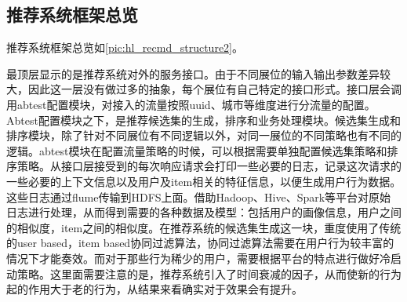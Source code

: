 		\subsection{推荐系统框架总览}
		推荐系统框架总览如\autoref{pic:hl_recmd_structure2}。
		\begin{figure}
	    \centering
	      \label{pic:hl_recmd_structure2}
	    \end{figure}

		最顶层显示的是推荐系统对外的服务接口。由于不同展位的输入输出参数差异较大，因此这一层没有做过多的抽象，每个展位有自己特定的接口形式。接口层会调用abtest配置模块，对接入的流量按照uuid、城市等维度进行分流量的配置。Abtest配置模块之下，是推荐候选集的生成，排序和业务处理模块。候选集生成和排序模块，除了针对不同展位有不同逻辑以外，对同一展位的不同策略也有不同的逻辑。abtest模块在配置流量策略的时候，可以根据需要单独配置候选集策略和排序策略。从接口层接受到的每次响应请求会打印一些必要的日志，记录这次请求的一些必要的上下文信息以及用户及item相关的特征信息，以便生成用户行为数据。这些日志通过flume传输到HDFS上面。借助Hadoop、Hive、Spark等平台对原始日志进行处理，从而得到需要的各种数据及模型：包括用户的画像信息，用户之间的相似度，item之间的相似度。在推荐系统的候选集生成这一块，重度使用了传统的user based，item based协同过滤算法，协同过滤算法需要在用户行为较丰富的情况下才能奏效。而对于那些行为稀少的用户，需要根据平台的特点进行做好冷启动策略。这里面需要注意的是，推荐系统引入了时间衰减的因子，从而使新的行为起的作用大于老的行为，从结果来看确实对于效果会有提升。
